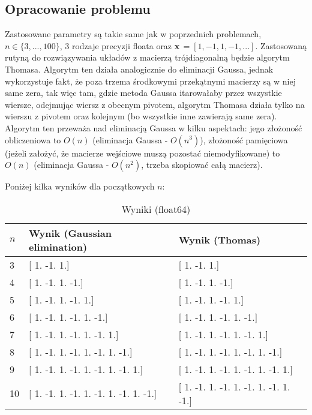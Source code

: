 \documentclass{article}
\begin{document}
\subsection{Opracowanie problemu}
Zastosowane parametry są takie same jak w poprzednich problemach, $n\in\{3,...,100\}$, 3 rodzaje precyzji floata oraz 
\textbf{x}\,$=[1,-1,1,-1,...]$. Zastosowaną rutyną do rozwiązywania układów z macierzą trójdiagonalną będzie algorytm 
Thomasa. Algorytm ten działa analogicznie do eliminacji Gaussa, jednak wykorzystuje fakt, że poza trzema środkowymi
przekątnymi macierzy są w niej same zera, tak więc tam, gdzie metoda Gaussa itarowałaby przez wszystkie wiersze, odejmując
wiersz z obecnym pivotem, algorytm Thomasa działa tylko na wierszu z pivotem oraz kolejnym (bo wszystkie inne zawierają same
zera). Algorytm ten przeważa nad eliminacją Gaussa w kilku aspektach: jego złożoność obliczeniowa to $O(n)$ (eliminacja
Gaussa - $O(n^3)$), złożoność pamięciowa (jeżeli założyć, że macierze wejściowe muszą pozostać niemodyfikowane) to 
$O(n)$ (eliminacja Gaussa - $O(n^2)$, trzeba skopiować całą macierz).

Poniżej kilka wyników dla początkowych $n$:

\begin{table}[H]
\hspace*{-1.2cm}
\centering
\begin{tabular}{|l|p{5cm}|p{8cm}|}
\hline
$n$ & Wynik (Gaussian elimination) & Wynik (Thomas) \\ \hline
3 & [ 1. -1.  1.] & [ 1. -1.  1.] \\ \hline
4 & [ 1. -1.  1. -1.] & [ 1. -1.  1. -1.] \\ \hline
5 & [ 1. -1.  1. -1.  1.] & [ 1. -1.  1. -1.  1.] \\ \hline
6 & [ 1. -1.  1. -1.  1. -1.] & [ 1. -1.  1. -1.  1. -1.] \\ \hline
7 & [ 1. -1.  1. -1.  1. -1.  1.] & [ 1. -1.  1. -1.  1. -1.  1.] \\ \hline
8 & [ 1. -1.  1. -1.  1. -1.  1. -1.] & [ 1. -1.  1. -1.  1. -1.  1. -1.] \\ \hline
9 & [ 1. -1.  1. -1.  1. -1.  1. -1.  1.] & [ 1. -1.  1. -1.  1. -1.  1. -1.  1.] \\ \hline
10 & [ 1. -1.  1. -1.  1. -1.  1. -1.  1. -1.] & [ 1. -1.  1. -1.  1. -1.  1. -1.  1. -1.] \\ \hline
\end{tabular}
\caption{Wyniki (float64)}
\hspace*{-1.2cm}
\end{table}
\end{document}
